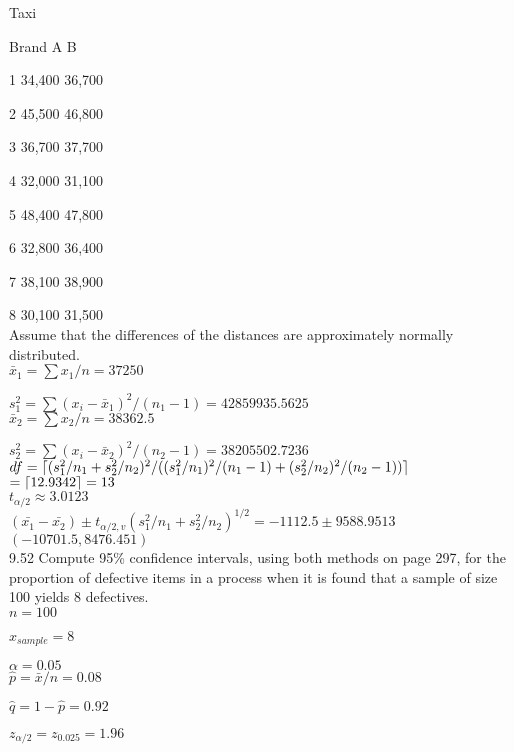 Taxi 

Brand A B 

1 34,400 36,700 

2 45,500 46,800

3 36,700 37,700

4 32,000 31,100

5 48,400 47,800

6 32,800 36,400

7 38,100 38,900

8 30,100 31,500 \\

Assume that the differences of the distances are approximately normally distributed. \\

$\bar{x}_1 = \sum x_1 /n$$ = 37250$

$s_1^2 = \sum(x_i - \bar{x}_1)^2/(n_1-1) = 42859935.5625$ \\

$\bar{x}_2 = \sum x_2 /n$$ = 38362.5$

$s_2^2 = \sum(x_i - \bar{x}_2)^2/(n_2-1) = 38205502.7236$ \\

$df = \lceil(s^2_1/n_1 + s^2_2/n_2)^2/((s^2_1/n_1)^2/(n_1-1) + (s_2^2/n_2)^2/(n_2 - 1))\rceil$$ = \lceil12.9342\rceil = 13$ \\

$t_{\alpha/2} \approx 3.0123$ \\


$(\bar{x_1} - \bar{x_2}) \pm t_{\alpha/2,v} (s_1^2/n_1 + s_2^2/n_2)^{1/2}$$= -1112.5 \pm 9588.9513$ \\

$(-10701.5, 8476.451)$ \\

9.52 Compute 95\% confidence intervals, using both methods on page 297, for the proportion of defective items in a process when it is found that a sample of size 100 yields 8 defectives. \\ 

$n = 100$

$x_{sample} = 8$

$\alpha = 0.05$ \\


$\hat{p} = \bar{x}/n = 0.08$

$\hat{q} = 1 - \hat{p} = 0.92$

$z_{\alpha/2} = z_{0.025} = 1.96$  \\

